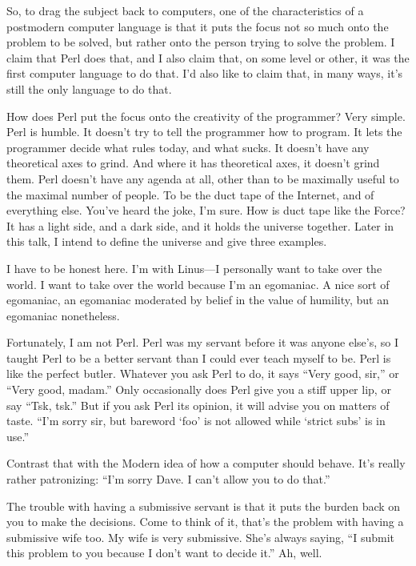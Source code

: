 So, to drag the subject back to computers, one of the characteristics of a
postmodern computer language is that it puts the focus not so much onto the
problem to be solved, but rather onto the person trying to solve the problem.
I claim that Perl does that, and I also claim that, on some level or other,
it was the first computer language to do that. I'd also like to claim that,
in many ways, it's still the only language to do that.

How does Perl put the focus onto the creativity of the programmer? Very
simple. Perl is humble. It doesn't try to tell the programmer how to program.
It lets the programmer decide what rules today, and what sucks. It doesn't
have any theoretical axes to grind. And where it has theoretical axes, it
doesn't grind them. Perl doesn't have any agenda at all, other than to be
maximally useful to the maximal number of people. To be the duct tape of the
Internet, and of everything else. You've heard the joke, I'm sure. How is
duct tape like the Force? It has a light side, and a dark side, and it holds
the universe together. Later in this talk, I intend to define the universe
and give three examples.

I have to be honest here. I'm with Linus---I personally want to take over the
world. I want to take over the world because I'm an egomaniac. A nice sort of
egomaniac, an egomaniac moderated by belief in the value of humility, but an
egomaniac nonetheless.

Fortunately, I am not Perl. Perl was my servant before it was anyone else's,
so I taught Perl to be a better servant than I could ever teach myself to be.
Perl is like the perfect butler. Whatever you ask Perl to do, it says ``Very
good, sir,'' or ``Very good, madam.'' Only occasionally does Perl give you
a stiff upper lip, or say ``Tsk, tsk.'' But if you ask Perl its opinion, it
will advise you on matters of taste. ``I'm sorry sir, but bareword `foo' is
not allowed while `strict subs' is in use.''

Contrast that with the Modern idea of how a computer should behave. It's
really rather patronizing: ``I'm sorry Dave. I can't allow you to do
that.''

The trouble with having a submissive servant is that it puts the burden back
on you to make the decisions. Come to think of it, that's the problem with
having a submissive wife too. My wife is very submissive. She's always
saying, ``I submit this problem to you because I don't want to decide it.''
Ah, well.

